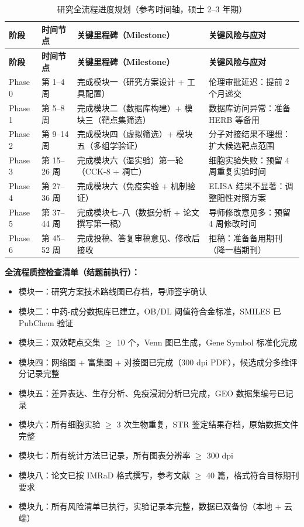 \documentclass[12pt,a4paper,twoside]{article}
\begin{document}
\begin{longtable}{p{1.5cm}p{3cm}p{5cm}p{4cm}}
\caption{研究全流程进度规划（参考时间轴，硕士 2--3 年期）} \label{tab:timeline} \\
\toprule
\textbf{阶段} & \textbf{时间节点} & \textbf{关键里程碑（Milestone）} & \textbf{关键风险与应对} \\
\midrule
\endfirsthead
\toprule
\textbf{阶段} & \textbf{时间节点} & \textbf{关键里程碑（Milestone）} & \textbf{关键风险与应对} \\
\midrule
\endhead
\bottomrule
\endlastfoot
Phase 0 & 第 1--4 周 & 完成模块一（研究方案设计 + 工具配置）& 伦理审批延迟：提前 2 个月递交 \\
\addlinespace
Phase 1 & 第 5--8 周 & 完成模块二（数据库构建）+ 模块三（靶点集筛选）& 数据库访问异常：准备 HERB 等备用 \\
\addlinespace
Phase 2 & 第 9--14 周 & 完成模块四（虚拟筛选）+ 模块五（多组学验证）& 分子对接结果不理想：扩大候选靶点范围 \\
\addlinespace
Phase 3 & 第 15--26 周 & 完成模块六（湿实验）第一轮（CCK-8 + 凋亡）& 细胞实验失败：预留 4 周重复实验时间 \\
\addlinespace
Phase 4 & 第 27--36 周 & 完成模块六（免疫实验 + 机制验证）& ELISA 结果不显著：调整阳性对照方案 \\
\addlinespace
Phase 5 & 第 37--44 周 & 完成模块七--八（数据分析 + 论文撰写第一稿）& 导师修改意见多：预留 4 周修改时间 \\
\addlinespace
Phase 6 & 第 45--52 周 & 完成投稿、答复审稿意见、修改后接收 & 拒稿：准备备用期刊（降一档期刊）\\
\bottomrule
\end{longtable}

\begin{qcbox}
\textbf{全流程质控检查清单（结题前执行）：}
\begin{itemize}
  \item 模块一：研究方案技术路线图已存档，导师签字确认 
  \item 模块二：中药-成分数据库已建立，OB/DL 阈值符合金标准，SMILES 已 PubChem 验证 
  \item 模块三：双效靶点交集 $\geq$ 10 个，Venn 图已生成，Gene Symbol 标准化完成 
  \item 模块四：网络图 + 富集图 + 对接图已完成（300 dpi PDF），候选成分多维评分记录完整 
  \item 模块五：差异表达、生存分析、免疫浸润分析已完成，GEO 数据集编号已记录 
  \item 模块六：所有细胞实验 $\geq$ 3 次生物重复，STR 鉴定结果存档，原始数据文件完整 
  \item 模块七：所有统计方法已记录，所有图表分辨率 $\geq$ 300 dpi 
  \item 模块八：论文已按 IMRaD 格式撰写，参考文献 $\geq$ 40 篇，格式符合目标期刊要求 
  \item 模块九：所有风险清单已执行，实验记录本完整，数据已双备份（本地 + 云端）
\end{itemize}
\end{qcbox}
\end{document}
